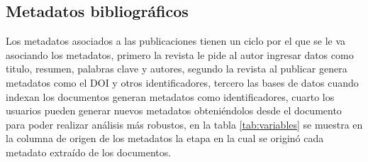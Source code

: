 \documentclass[../Main.tex]{subfiles}
\begin{document}
\subsection{Metadatos bibliográficos}
Los metadatos asociados a las publicaciones tienen un ciclo por el que se le va asociando los metadatos, primero la revista le pide al autor ingresar datos como titulo, resumen, palabras clave y autores, segundo la revista al publicar genera metadatos como el DOI y otros identificadores, tercero las bases de datos cuando indexan los documentos generan metadatos como identificadores, cuarto los usuarios pueden generar nuevos metadatos obteniéndolos desde el documento para poder realizar análisis más robustos, en la tabla \ref{tab:variables} se muestra en la columna de origen de los metadatos la etapa en la cual se originó cada metadato extraído de los documentos. 
\end{document}
